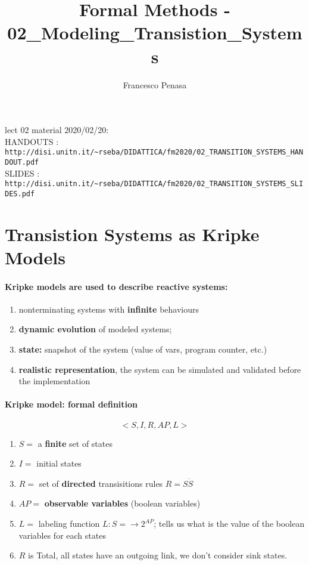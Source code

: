 \documentclass[11pt]{article}
\begin{document}
\author{Francesco Penasa}
\title{Formal Methods - 02\_Modeling\_Transistion\_Systems}
\maketitle

\medskip

lect 02 material 2020/02/20: 
\\
HANDOUTS : \texttt{http://disi.unitn.it/\~{}rseba/DIDATTICA/fm2020/02\_TRANSITION\_SYSTEMS\_HANDOUT.pdf}
\\
SLIDES : \texttt{http://disi.unitn.it/\~{}rseba/DIDATTICA/fm2020/02\_TRANSITION\_SYSTEMS\_SLIDES.pdf} 
\\

\section{Transistion Systems as Kripke Models} %
\label{sec:transistion_systems_as_kripke_models}
\paragraph{Kripke models are used to describe reactive systems:} %
\label{par:kripke_models_are_used_to_describe_reactive_systems_}
\begin{enumerate}
	\item nonterminating systems with \textbf{infinite} behaviours
	\item \textbf{dynamic evolution} of modeled systems;
	\item \textbf{state:} snapshot of the system (value of vars, program counter, etc.)
	\item \textbf{realistic representation}, the system can be simulated and validated before the implementation
\end{enumerate}


\paragraph{Kripke model: formal definition} %
\label{par:kripke_model_formal_definition}
\[
	<S,I,R,AP,L>	
\]
\begin{enumerate}
	\item $S =$ a \textbf{finite} set of states
	\item $I =$ initial states 
	\item $R =$ set of \textbf{directed} transisitions rules $R = S \dot S$
	\item $AP =$ \textbf{observable variables} (boolean variables)  
	\item $L =$ labeling function $L : S = \rightarrow 2^{AP}$; tells us what is the value of the boolean variables for each states 
	\item $R$ is Total, all states have an outgoing link, we don't consider sink states.
\end{enumerate}
\end{document}
